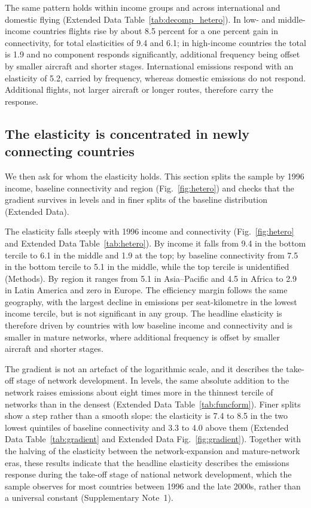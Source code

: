 \documentclass[12pt]{extarticle}
\begin{document}
The same pattern holds within income groups and across international and
domestic flying (Extended Data Table~\ref{tab:decomp_hetero}). In low-
and middle-income countries flights rise by about 8.5 percent for a one
percent gain in connectivity, for total elasticities of 9.4 and 6.1; in
high-income countries the total is 1.9 and no component responds
significantly, additional frequency being offset by smaller aircraft and
shorter stages. International emissions respond with an elasticity of
5.2, carried by frequency, whereas domestic emissions do not respond.
Additional flights, not larger aircraft or longer routes, therefore carry
the response.

\subsection*{The elasticity is concentrated in newly connecting countries}
We then ask for whom the elasticity holds. This section splits the sample
by 1996 income, baseline connectivity and region (Fig.~\ref{fig:hetero})
and checks that the gradient survives in levels and in finer splits of the
baseline distribution (Extended Data).

The elasticity falls steeply with 1996 income and connectivity
(Fig.~\ref{fig:hetero} and Extended Data Table~\ref{tab:hetero}). By
income it falls from 9.4 in the bottom tercile to 6.1 in the middle and
1.9 at the top; by baseline connectivity from 7.5 in the bottom tercile
to 5.1 in the middle, while the top tercile is unidentified (Methods). By
region it ranges from 5.1 in Asia--Pacific and 4.5 in Africa to 2.9 in
Latin America and zero in Europe. The efficiency margin follows the same
geography, with the largest decline in emissions per seat-kilometre in
the lowest income tercile, but is not significant in any group. The
headline elasticity is therefore driven by countries with low baseline
income and connectivity and is smaller in mature networks, where
additional frequency is offset by smaller aircraft and shorter stages.

The gradient is not an artefact of the logarithmic scale, and it describes
the take-off stage of network development. In levels, the same absolute
addition to the network raises emissions about eight times more in the
thinnest tercile of networks than in the densest (Extended Data
Table~\ref{tab:funcform}). Finer splits show a step rather than a smooth
slope: the elasticity is 7.4 to 8.5 in the two lowest quintiles of
baseline connectivity and 3.3 to 4.0 above them (Extended Data
Table~\ref{tab:gradient} and Extended Data Fig.~\ref{fig:gradient}).
Together with the halving of the elasticity between the
network-expansion and mature-network eras, these results indicate that
the headline elasticity describes the emissions response during the
take-off stage of national network development, which the sample observes
for most countries between 1996 and the late 2000s, rather than a
universal constant (Supplementary Note~1).
\end{document}
